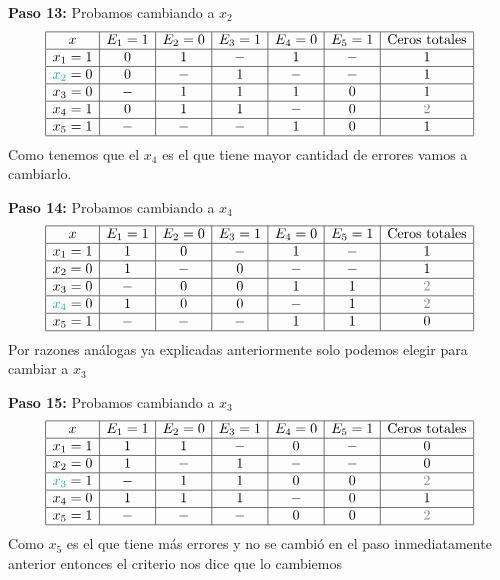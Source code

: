 \begin{sol}
\textbf{Paso 13:} Probamos cambiando a $x_2$
\[
\begin{array}{|c|c|c|c|c|c|c|c|}
\hline
x & E_1=1 & E_2=0 & E_3=1 & E_4=0 & E_5=1 & \text{Ceros totales}\\
\hline
x_1= 1& 0 & 1 & - & 1 & - & 1\\
\hline
\textcolor{cyan}{x_2}=0& 0&-& 1& - &-&1\\
\hline
x_3=0& -& 1& 1 & 1 & 0 &1\\
\hline
x_4=1& 0&1&1&-&0&\textcolor{gray}{2}\\
\hline
x_5=1&-&-&-&1&0&1\\
\hline
\end{array}
\]
Como tenemos que el $x_4$ es el que tiene mayor cantidad de errores vamos a cambiarlo.

\textbf{Paso 14:} Probamos cambiando a $x_4$
\[
\begin{array}{|c|c|c|c|c|c|c|c|}
\hline
x & E_1=1 & E_2=0 & E_3=1 & E_4=0 & E_5=1 & \text{Ceros totales}\\
\hline
x_1= 1& 1 & 0 & - & 1 & - & 1\\
\hline
x_2=0& 1&-& 0& - &-&1\\
\hline
x_3=0& -& 0& 0 & 1 & 1 &\textcolor{gray}{2}\\
\hline
\textcolor{cyan}{x_4}=0& 1&0&0&-&1&\textcolor{gray}{2}\\
\hline
x_5=1&-&-&-&1&1&0\\
\hline
\end{array}
\]
Por razones análogas ya explicadas anteriormente solo podemos elegir para cambiar a $x_3$

\textbf{Paso 15:} Probamos cambiando a $x_3$
\[
\begin{array}{|c|c|c|c|c|c|c|c|}
\hline
x & E_1=1 & E_2=0 & E_3=1 & E_4=0 & E_5=1 & \text{Ceros totales}\\
\hline
x_1= 1& 1 & 1 & - & 0 & - & 0\\
\hline
x_2=0& 1&-& 1& - &-&0\\
\hline
\textcolor{cyan}{x_3}=1& -& 1& 1 & 0 & 0 &\textcolor{gray}{2}\\
\hline
x_4=0& 1&1&1&-&0&1\\
\hline
x_5=1&-&-&-&0&0&\textcolor{gray}{2}\\
\hline
\end{array}
\]
Como $x_5$ es el que tiene más errores y no se cambió en el paso inmediatamente anterior entonces el criterio nos dice que lo cambiemos


\end{sol}
